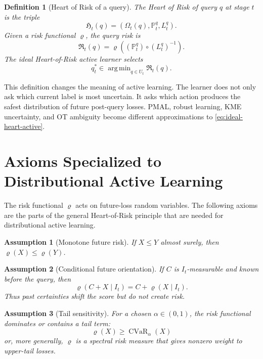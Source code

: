 \documentclass[10pt,journal]{IEEEtran}
\newtheorem{definition}{Definition}
\newtheorem{assumption}{Assumption}
\DeclareMathOperator*{\argmin}{arg\,min}
\DeclareMathOperator{\CVaR}{CVaR}
\newcommand{\Prob}{\mathbb{P}}
\newcommand{\HR}{\mathfrak{H}}
\newcommand{\risk}{\varrho}
\begin{document}
\begin{definition}[Heart of Risk of a query]
\label{def:query-heart-risk}
The Heart of Risk of query $q$ at stage $t$ is the triple
\begin{equation}
    \HR_t(q)=\left(\Omega_t(q),\Prob_t^q,L_t^q\right).
\end{equation}
Given a risk functional $\risk$, the query risk is
\begin{equation}
\label{eq:query-heart-risk}
    \mathfrak R_t(q)=\risk\!\left((\Prob_t^q)\circ (L_t^q)^{-1}\right).
\end{equation}
The ideal Heart-of-Risk active learner selects
\begin{equation}
\label{eq:ideal-heart-active}
    q_t^*\in\argmin_{q\in U_t}\mathfrak R_t(q).
\end{equation}
\end{definition}

This definition changes the meaning of active learning. The learner does not only ask which current label is most uncertain. It asks which action produces the safest distribution of future post-query losses. PMAL, robust learning, KME uncertainty, and OT ambiguity become different approximations to \eqref{eq:ideal-heart-active}.

\section{Axioms Specialized to Distributional Active Learning}
\label{sec:dal-risk-axioms}

The risk functional $\risk$ acts on future-loss random variables. The following axioms are the parts of the general Heart-of-Risk principle that are needed for distributional active learning.

\begin{assumption}[Monotone future risk]
\label{ass:monotone-risk}
If $X\le Y$ almost surely, then $\risk(X)\le \risk(Y)$.
\end{assumption}

\begin{assumption}[Conditional future orientation]
\label{ass:future-oriented}
If $C$ is $I_t$-measurable and known before the query, then
\begin{equation}
    \risk(C+X\mid I_t)=C+\risk(X\mid I_t).
\end{equation}
Thus past certainties shift the score but do not create risk.
\end{assumption}

\begin{assumption}[Tail sensitivity]
\label{ass:tail-sensitive}
For a chosen $\alpha\in(0,1)$, the risk functional dominates or contains a tail term:
\begin{equation}
    \risk(X)\ge \CVaR_\alpha(X)
\end{equation}
or, more generally, $\risk$ is a spectral risk measure that gives nonzero weight to upper-tail losses.
\end{assumption}
\end{document}
